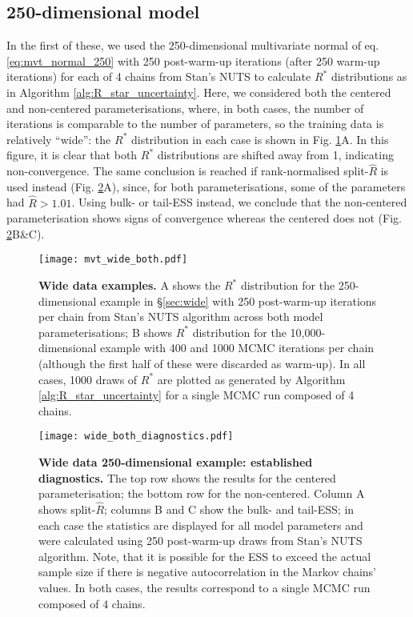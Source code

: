 \documentclass{article}
\begin{document}
\subsection{250-dimensional model}
In the first of these, we used the 250-dimensional multivariate normal of eq. \eqref{eq:mvt_normal_250} with 250 post-warm-up iterations (after 250 warm-up iterations) for each of 4 chains from Stan's NUTS to calculate $R^*$ distributions as in Algorithm \ref{alg:R_star_uncertainty}. Here, we considered both the centered and non-centered parameterisations, where, in both cases, the number of iterations is comparable to the number of parameters, so the training data is relatively ``wide'': the $R^*$ distribution in each case is shown in Fig. \ref{fig:mvt_wide_both}A. In this figure, it is clear that both $R^*$ distributions are shifted away from 1, indicating non-convergence. The same conclusion is reached if rank-normalised split-$\widehat{R}$ is used instead (Fig. \ref{fig:wide_both_diagnostics}A), since, for both parameterisations, some of the parameters had $\widehat{R}>1.01$. Using bulk- or tail-ESS instead, we conclude that the non-centered parameterisation shows signs of convergence whereas the centered does not (Fig. \ref{fig:wide_both_diagnostics}B\&C). 

\begin{figure}[!htb]
	\centerline{\texttt{[image: mvt\_wide\_both.pdf]}}
	\caption{\textbf{Wide data examples.} A shows the $R^*$ distribution for the 250-dimensional example in \S\ref{sec:wide} with 250 post-warm-up iterations per chain from Stan's NUTS algorithm across both model parameterisations; B shows $R^*$ distribution for the 10,000-dimensional example with 400 and 1000 MCMC iterations per chain (although the first half of these were discarded as warm-up). In all cases, 1000 draws of $R^*$ are plotted as generated by Algorithm \ref{alg:R_star_uncertainty} for a single MCMC run composed of 4 chains.}
	\label{fig:mvt_wide_both}
\end{figure}

\begin{figure}[!htb]
	\centerline{\texttt{[image: wide\_both\_diagnostics.pdf]}}
	\caption{\textbf{Wide data 250-dimensional example: established diagnostics.} The top row shows the results for the centered parameterisation; the bottom row for the non-centered. Column A shows split-$\widehat{R}$; columns B and C show the bulk- and tail-ESS; in each case the statistics are displayed for all model parameters and were calculated using 250 post-warm-up draws from Stan's NUTS algorithm. Note, that it is possible for the ESS to exceed the actual sample size if there is negative autocorrelation in the Markov chains' values. In both cases, the results correspond to a single MCMC run composed of 4 chains.}
	\label{fig:wide_both_diagnostics}
\end{figure}
\end{document}
